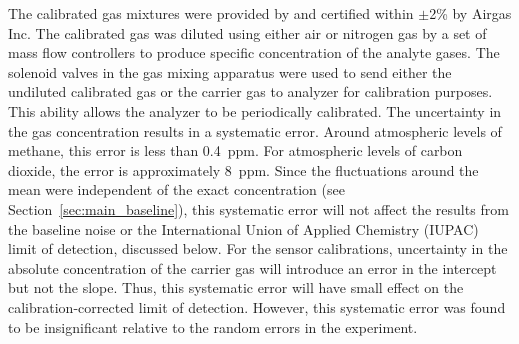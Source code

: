 \documentclass[times]{joehreview}
\begin{document}
	The calibrated gas mixtures were provided by and certified within $\pm$2\% by Airgas Inc.  The calibrated gas was diluted using either air or nitrogen gas by a set of mass flow controllers to produce specific concentration of the analyte gases.  The solenoid valves in the gas mixing apparatus were used to send either the undiluted calibrated gas or the carrier gas to analyzer for calibration purposes.  This ability allows the analyzer to be periodically calibrated.  The uncertainty in the gas concentration results in a systematic error.  Around atmospheric levels of methane, this error is less than 0.4~ppm.  For atmospheric levels of carbon dioxide, the error is approximately 8~ppm.  Since the fluctuations around the mean were independent of the exact concentration (see Section~\ref{sec:main_baseline}), this systematic error will not affect the results from the baseline noise or the International Union of Applied Chemistry (IUPAC) limit of detection, discussed below.  For the sensor calibrations, uncertainty in the absolute concentration of the carrier gas will introduce an error in the intercept but not the slope.  Thus, this systematic error will have small effect on the calibration-corrected limit of detection.  However, this systematic error was found to be insignificant relative to the random errors in the experiment.  
	
\end{document}
